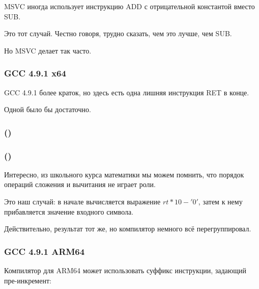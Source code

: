 MSVC иногда использует инструкцию ADD с отрицательной константой вместо SUB.

Это тот случай.
Честно говоря, трудно сказать, чем это лучше, чем SUB.

Но MSVC делает так часто.

\subsubsection{\Optimizing GCC 4.9.1 x64}

\Optimizing GCC 4.9.1 более краток, но здесь есть одна лишняя инструкция RET в конце.

Одной было бы достаточно.



\subsubsection{\OptimizingKeilVI (\ARMMode)}



\subsubsection{\OptimizingKeilVI (\ThumbMode)}



Интересно, из школьного курса математики мы можем помнить, что порядок операций сложения и вычитания
не играет роли.

Это наш случай: в начале вычисляется выражение $rt*10 - '0'$, затем к нему прибавляется 
значение входного символа.

Действительно, результат тот же, но компилятор немного всё перегруппировал.

\subsubsection{\Optimizing GCC 4.9.1 ARM64}

Компилятор для ARM64 может использовать суффикс инструкции, задающий пре-инкремент:



